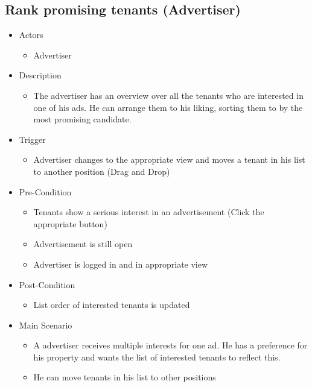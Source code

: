 \documentclass[a4paper,11pt]{article}
\begin{document}
\subsection*{Rank promising tenants (Advertiser)}
\begin{itemize}
	\item Actors
		\begin{itemize}
			\item Advertiser
		\end{itemize}
	\item Description
		\begin{itemize}
			\item The advertiser has an overview over all the tenants who are interested in one of his ads. He can arrange them to his liking, sorting them to by the most promising candidate.
		\end{itemize}
	\item Trigger
		\begin{itemize}
			\item Advertiser changes to the appropriate view and moves a tenant in his list to another position (Drag and Drop)
		\end{itemize}
	\item Pre-Condition
		\begin{itemize}
			\item Tenants show a serious interest in an advertisement (Click the appropriate button)
			\item Advertisement is still open
			\item Advertiser is logged in and in appropriate view
		\end{itemize}
	\item Post-Condition
		\begin{itemize}
			\item List order of interested tenants is updated
		\end{itemize}
	\item Main Scenario
		\begin{itemize}
			\item A advertiser receives multiple interests for one ad. He has a preference for his property and wants the list of interested tenants to reflect this.
			\item He can move tenants in his list to other positions
		\end{itemize}
\end{itemize}
\end{document}
